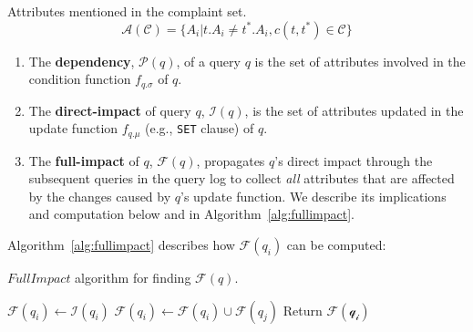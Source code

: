 
\begin{definition} 
	Attributes mentioned in the complaint set.
	\[\mathcal{A}(\mathcal{C}) = \{A_i | t.A_i \neq t^*.A_i, c(t,t^*) \in \mathcal{C}\}\]
\end{definition} 


\begin{definition}
  \begin{enumerate}
    \item The \textbf{dependency}, $\mathcal{P}(q)$, of a query $q$
    is the set of attributes  involved in the condition function $f_{q.\sigma}$ of $q$.
    \item The \textbf{direct-impact} of query $q$, 
    $\mathcal{I}(q)$, is the set of attributes 
    updated in the update function $f_{q.\mu}$ 
    (e.g., \texttt{SET} clause) of $q$.
    \item The \textbf{full-impact}
    of $q$, $\mathcal{F}(q)$, propagates $q$'s direct impact through
    the subsequent queries in the query log to collect {\it all} attributes
    that are affected by the changes caused by $q$'s update function.
    We describe its implications and computation below and in Algorithm~\ref{alg:fullimpact}.
  \end{enumerate}
\end{definition}


Algorithm~\ref{alg:fullimpact} describes how $\mathcal{F}(q_i)$ can be computed:

\begin{algorithm}[htbp]
\caption{$FullImpact$ algorithm for finding $\mathcal{F}(q)$.}
\label{alg:fullimpact}
\begin{algorithmic}
\STATE $\mathcal{F}(q_i) \leftarrow \mathcal{I}(q_i)$
\STATE $\mathcal{F}(q_i) \leftarrow \mathcal{F}(q_i) \cup \mathcal{F}(q_j)$
\ENDIF
\ENDFOR
\STATE Return $\mathcal{F}(\mathcal{q_i})$
\end{algorithmic}
\end{algorithm}

